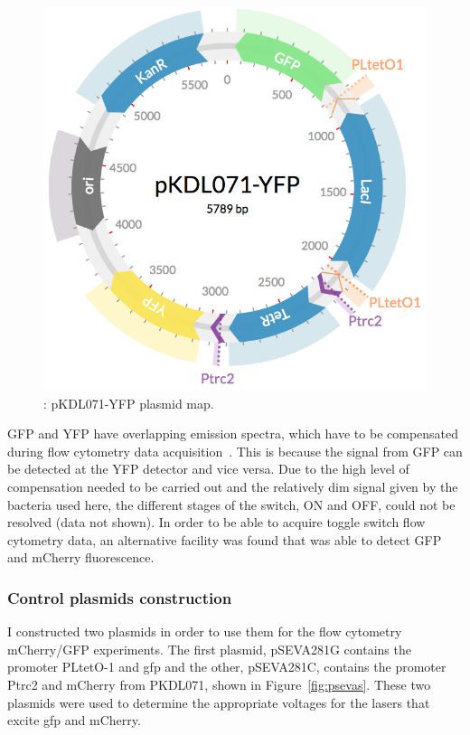 \begin{figure}[tb]
	\begin{center}
		\includegraphics[scale=0.3]{../../chapters/chapterABCFlow/images/pKDL071-YFP.png}
		\caption[pKDL071-YFP plasmid map ]{\label{fig:pkdl071yfp}: pKDL071-YFP plasmid map.  }
	\end{center}
\end{figure}

GFP and YFP have overlapping emission spectra, which have to be compensated during flow cytometry data acquisition~\autocite{Shapiro:1941}. This is because the signal from GFP can be detected at the YFP detector and vice versa. Due to the high level of compensation needed to be carried out and the relatively dim signal given by the bacteria used here, the different stages of the switch, ON and OFF, could not be resolved (data not shown). In order to be able to acquire toggle switch flow cytometry data, an alternative facility was found that was able to detect GFP and mCherry fluorescence. 

\subsubsection{Control plasmids construction}
I constructed two plasmids in order to use them for the flow cytometry mCherry/GFP experiments. The first plasmid, pSEVA281G contains the promoter PLtetO-1 and \acrshort{gfp} and the other, pSEVA281C, contains the promoter Ptrc2 and mCherry from PKDL071, shown in Figure~\ref{fig:psevas}. These two plasmids were used to determine the appropriate voltages for the lasers that excite \acrshort{gfp} and mCherry.

